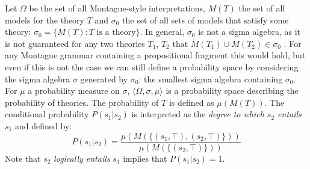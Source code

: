 \documentclass[a4paper,11pt]{article}
\theoremstyle{definition}
\begin{document}
Let $\Omega$ be the set of all Montague-style interpretations,  $M(T)$ the set of all models for the theory $T$ and
$\sigma_0$ the set of all sets of models that satisfy some theory: $\sigma_0 = \{M(T) : T\text{ is a theory}\}$.
In general, $\sigma_0$ is not a sigma algebra, as it is not
guaranteed for any two theories $T_1$, $T_2$ that
$M(T_1)\cup M(T_2) \in \sigma_0$ . For any Montague grammar containing a propositional
fragment  this would hold, but even if this is not the case we
can still define a probability space by considering the sigma algebra
$\sigma$ generated by $\sigma_0$: the smallest
sigma algebra containing $\sigma_0$. For $\mu$ a probability measure on $\sigma$, 
$\langle\Omega,\sigma,\mu\rangle$ is a probability space
describing the probability of theories. The probability of $T$ is defined as
$\mu(M(T))$. The conditional
probability $P(s_1 | s_2 )$  is interpreted as the {\em degree to which $s_2$ entails $s_1$\/} and defined by:
$$ P(s_1|s_2) = \frac{\mu(M(\{(s_1, \top), (s_2, \top)\}))}{\mu(M(\{(s_2,\top)\}))}$$
Note that $s_2$ {\em logically entails\/} $s_1$ implies that $P(s_1|s_2) = 1$.




\end{document}
